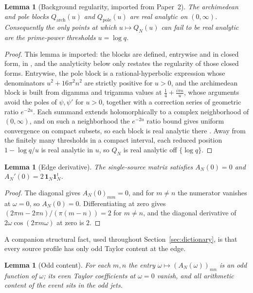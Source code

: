 \documentclass[11pt]{article}
\theoremstyle{plain}
\newtheorem{lemma}[theorem]{Lemma}
\theoremstyle{definition}
\theoremstyle{remark}
\newcommand{\one}{\mathbf 1}
\begin{document}
\begin{lemma}[Background regularity, imported from Paper~2]\label{lem:background}
The archimedean and pole blocks $Q_{\mathrm{arch}}(u)$ and $Q_{\mathrm{pole}}(u)$
are real analytic on $(0,\infty)$. Consequently the only points at which
$u\mapsto Q_N(u)$ can fail to be real analytic are the prime-power thresholds
$u=\log q$.
\end{lemma}

\begin{proof}
This lemma is imported: the blocks are defined, entrywise and in closed form,
in \cite[Lemma~2.1]{Groskin2026FiniteDictionary}, and the analyticity below
only restates the regularity of those closed forms.
Entrywise, the pole block is a rational-hyperbolic expression whose denominators
$u^2+16\pi^2n^2$ are strictly positive for $u>0$, and the archimedean block is
built from digamma and trigamma values at $\tfrac14+\tfrac{i\pi n}{u}$, whose
arguments avoid the poles of $\psi,\psi'$ for $u>0$, together with a correction
series of geometric ratio $e^{-2u}$. Each summand extends holomorphically to a
complex neighborhood of $(0,\infty)$, and on such a neighborhood the $e^{-2u}$
ratio bound gives uniform convergence on compact subsets, so each block is real
analytic there \cite{Groskin2026FiniteDictionary}. Away from the finitely many
thresholds in a compact interval, each reduced position $1-\log q/u$ is real
analytic in $u$, so $Q_N$ is real analytic off $\{\log q\}$.
\end{proof}

\begin{lemma}[Edge derivative]\label{lem:edge}
The single-source matrix satisfies $A_N(0)=0$ and $A_N'(0)=2\,\one_N\one_N^t$.
\end{lemma}

\begin{proof}
The diagonal gives $A_N(0)_{mm}=0$, and for $m\ne n$ the numerator vanishes at
$\omega=0$, so $A_N(0)=0$. Differentiating at zero gives
$(2\pi m-2\pi n)/(\pi(m-n))=2$ for $m\ne n$, and the diagonal derivative of
$2\omega\cos(2\pi m\omega)$ at zero is $2$.
\end{proof}

A companion structural fact, used throughout Section~\ref{sec:dictionary}, is
that every source profile has only odd Taylor content at the edge.

\begin{lemma}[Odd content]\label{lem:odd}
For each $m,n$ the entry $\omega\mapsto(A_N(\omega))_{mn}$ is an odd function of
$\omega$; its even Taylor coefficients at $\omega=0$ vanish, and all arithmetic
content of the event sits in the odd jets.
\end{lemma}
\end{document}
